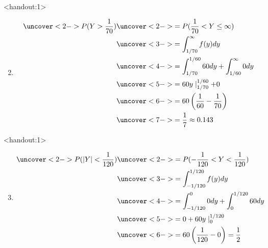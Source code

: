 \documentclass[handout]{beamer}\usepackage{graphicx, color}
\newcommand{\answers}{1}
\numberwithin{equation}{section}
\begin{document}
\begin{frame}<handout:\answers>
\begin{enumerate}[1. ]
\setcounter{enumi}{1}
\item 
\begin{align*}
\uncover<2->{ P( Y > \frac{1}{70})} & \uncover<2->{ = P(\frac{1}{70} < Y \le \infty)} \\
&\uncover<3->{ = \int_{1/70}^\infty f(y) dy} \\
&\uncover<4->{ = \int_{1/70}^{1/60} 60 dy + \int_{1/60}^\infty 0 dy} \\
&\uncover<5->{ = 60y \mid_{1/70}^{1/60} + 0} \\
&\uncover<6->{ = 60 \left (\frac{1}{60} - \frac{1}{70} \right )} \\
&\uncover<7->{ = \frac{1}{7} \approx 0.143}
\end{align*}
\end{enumerate}
\end{frame}



\begin{frame}<handout:\answers>
\begin{enumerate}[1. ]
\setcounter{enumi}{2}
\item 
\begin{align*}
\uncover<2->{ P(|Y| < \frac{1}{120})} & \uncover<2->{ = P(-\frac{1}{120} < Y < \frac{1}{120})} \\
&\uncover<3->{ = \int_{-1/120}^{1/120} f(y) dy} \\
& \uncover<4->{ = \int_{-1/120}^0 0 dy + \int_{0}^{1/120} 60 dy} \\
& \uncover<5->{ = 0 + 60y \mid_{0}^{1/120}} \\
& \uncover<6->{ = 60 \left (\frac{1}{120} - 0 \right ) = \frac{1}{2}}
\end{align*}
\end{enumerate}
\end{frame}
\end{document}

